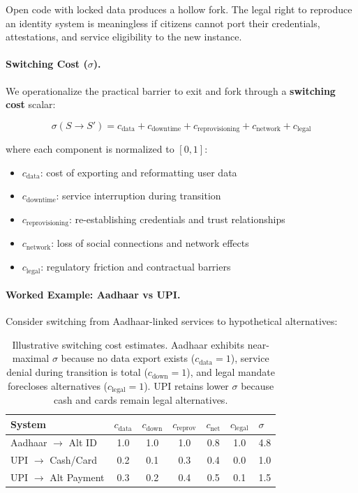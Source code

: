 Open code with locked data produces a hollow fork. The legal right to reproduce an identity system is meaningless if citizens cannot port their credentials, attestations, and service eligibility to the new instance.

\paragraph{Switching Cost ($\sigma$).} We operationalize the practical barrier to exit and fork through a \textbf{switching cost} scalar:

\begin{equation}
\sigma(S \to S') = c_{\text{data}} + c_{\text{downtime}} + c_{\text{reprovisioning}} + c_{\text{network}} + c_{\text{legal}}
\label{eq:switching-cost}
\end{equation}

where each component is normalized to $[0,1]$:
\begin{itemize}[noitemsep]
    \item $c_{\text{data}}$: cost of exporting and reformatting user data
    \item $c_{\text{downtime}}$: service interruption during transition
    \item $c_{\text{reprovisioning}}$: re-establishing credentials and trust relationships
    \item $c_{\text{network}}$: loss of social connections and network effects
    \item $c_{\text{legal}}$: regulatory friction and contractual barriers
\end{itemize}

\paragraph{Worked Example: Aadhaar vs UPI.} Consider switching from Aadhaar-linked services to hypothetical alternatives:

\begin{table}[htbp]
\centering
\small
\begin{tabular}{@{}lcccccl@{}}
\toprule
\textbf{System} & $c_{\text{data}}$ & $c_{\text{down}}$ & $c_{\text{reprov}}$ & $c_{\text{net}}$ & $c_{\text{legal}}$ & $\sigma$ \\
\midrule
Aadhaar $\to$ Alt ID & 1.0 & 1.0 & 1.0 & 0.8 & 1.0 & 4.8 \\
UPI $\to$ Cash/Card & 0.2 & 0.1 & 0.3 & 0.4 & 0.0 & 1.0 \\
UPI $\to$ Alt Payment & 0.3 & 0.2 & 0.4 & 0.5 & 0.1 & 1.5 \\
\bottomrule
\end{tabular}
\caption{Illustrative switching cost estimates. Aadhaar exhibits near-maximal $\sigma$ because no data export exists ($c_{\text{data}} = 1$), service denial during transition is total ($c_{\text{down}} = 1$), and legal mandate forecloses alternatives ($c_{\text{legal}} = 1$). UPI retains lower $\sigma$ because cash and cards remain legal alternatives.}
\label{tab:switching-example}
\end{table}

